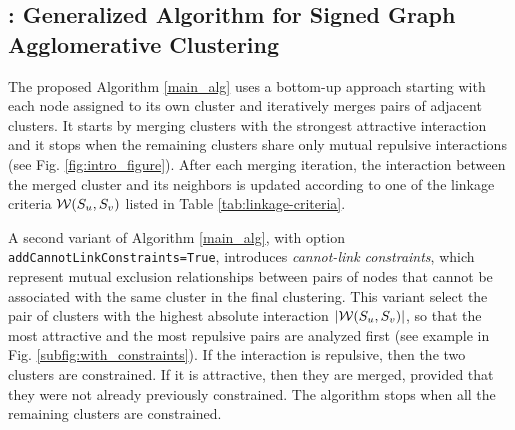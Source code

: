 \subsection{\algname{}: Generalized Algorithm for Signed Graph Agglomerative Clustering} \label{sec:algorithm} 

The proposed \algname{} Algorithm \ref{main_alg} uses a bottom-up approach starting with each node assigned to its own cluster and iteratively merges pairs of adjacent clusters. It starts by merging clusters with the strongest attractive interaction and it stops when the remaining clusters share only mutual repulsive interactions (see Fig. \hyperref[fig:intro_figure]{\ref*{fig:intro_figure}}). After each merging iteration, the interaction between the merged cluster and its neighbors is updated according to one of the linkage criteria $\mathcal{W}(S_u, S_v)$ listed in Table \ref{tab:linkage-criteria}.

A second variant of Algorithm \ref{main_alg}, with option \texttt{addCannotLinkConstraints=True}, introduces \emph{cannot-link constraints}, which represent mutual exclusion relationships between pairs of nodes that cannot be associated with the same cluster in the final clustering. This variant 
select the pair of clusters with the highest absolute interaction $|\mathcal{W}(S_u, S_v)|$, so that the most attractive and the most repulsive pairs are analyzed first (see example in Fig. \ref{subfig:with_constraints}). If the interaction is repulsive, then the two clusters are constrained. If it is attractive, then they are merged, provided that they were not already previously constrained. 
The algorithm stops when all the remaining clusters are constrained.

